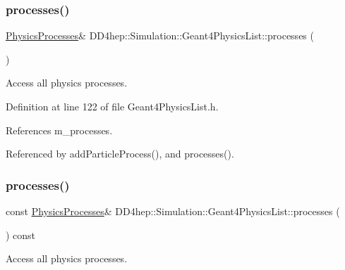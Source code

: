 \subsubsection{\texorpdfstring{processes()}{processes()}\hspace{0.1cm}{\footnotesize\ttfamily [1/4]}}
{\footnotesize\ttfamily \hyperlink{class_d_d4hep_1_1_simulation_1_1_geant4_physics_list_ab41e55687c9d57878fe2e6847a31f19a}{Physics\+Processes}\& D\+D4hep\+::\+Simulation\+::\+Geant4\+Physics\+List\+::processes (\begin{DoxyParamCaption}{ }\end{DoxyParamCaption})\hspace{0.3cm}{\ttfamily [inline]}}



Access all physics processes. 



Definition at line 122 of file Geant4\+Physics\+List.\+h.



References m\+\_\+processes.



Referenced by add\+Particle\+Process(), and processes().

\hypertarget{class_d_d4hep_1_1_simulation_1_1_geant4_physics_list_a962da5929e1e970352b314f9e937ac84}{}\label{class_d_d4hep_1_1_simulation_1_1_geant4_physics_list_a962da5929e1e970352b314f9e937ac84} 
\subsubsection{\texorpdfstring{processes()}{processes()}\hspace{0.1cm}{\footnotesize\ttfamily [2/4]}}
{\footnotesize\ttfamily const \hyperlink{class_d_d4hep_1_1_simulation_1_1_geant4_physics_list_ab41e55687c9d57878fe2e6847a31f19a}{Physics\+Processes}\& D\+D4hep\+::\+Simulation\+::\+Geant4\+Physics\+List\+::processes (\begin{DoxyParamCaption}{ }\end{DoxyParamCaption}) const\hspace{0.3cm}{\ttfamily [inline]}}



Access all physics processes. 



